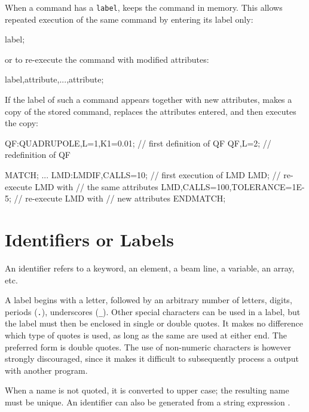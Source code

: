 When a command has a \texttt{label},
\opal keeps the command in memory.
This allows repeated execution of the same command
by entering its label only:
\begin{example}
label;
\end{example}
or to re-execute the command with modified attributes:
\begin{example}
label,attribute,...,attribute;
\end{example}
If the label of such a command appears together with new attributes,
\opal makes a copy of the stored command, replaces the attributes entered,
and then executes the copy:
\begin{example}
QF:QUADRUPOLE,L=1,K1=0.01; // first definition of QF
QF,L=2;                    // redefinition of QF

MATCH;
...
LMD:LMDIF,CALLS=10;           // first execution of LMD
LMD;                          // re-execute LMD with
                              // the same attributes
LMD,CALLS=100,TOLERANCE=1E-5; // re-execute LMD with
                              // new attributes
ENDMATCH;
\end{example}

\section{Identifiers or Labels}
\label{sec:label}
An identifier refers to a keyword, an element, a beam line, a variable,
an array, etc.

A label begins with a letter, followed by an arbitrary number of letters,
digits, periods (\texttt{.}), underscores (\texttt{\_}).
Other special characters can be used in a label,
but the label must then be enclosed in single or double quotes.
It makes no difference which type of quotes is used,
as long as the same are used at either end.
The preferred form is double quotes.
The use of non-numeric characters is however strongly discouraged,
since it makes it difficult to subsequently process a \opal output with
another program.

When a name is not quoted, it is converted to upper case;
the resulting name must be unique.
An identifier can also be generated from a
string expression .

